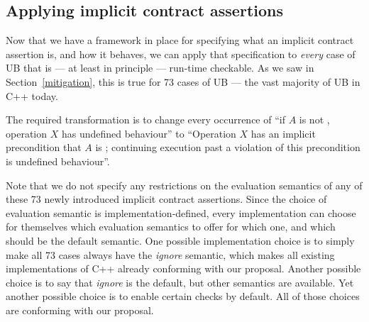 \subsection{Applying implicit contract assertions}
\label{applyicas}

Now that we have a framework in place for specifying what an implicit contract assertion is, and how it behaves, we can apply that specification to \emph{every} case of UB  that is --- at least in principle --- run-time checkable. As we saw in Section~\ref{mitigation}, this is true for 73 cases of UB --- the vast majority of UB in C++ today.

The required transformation is to change every occurrence of “if $A$ is not , operation $X$ has undefined behaviour'' to ``Operation $X$ has an implicit precondition that $A$ is ; continuing execution past a violation of this precondition is undefined behaviour''.

Note that we do not specify any restrictions on the evaluation semantics of any of these 73 newly introduced  implicit contract assertions. Since the choice of evaluation semantic is implementation-defined, every implementation can choose for themselves which evaluation semantics to offer for which one, and which should be the default semantic. One possible implementation choice is to simply make all 73 cases always have the \emph{ignore} semantic, which makes all existing implementations of C++ already conforming with our proposal. Another possible choice is to say that  \emph{ignore} is the default, but other semantics are available. Yet another possible choice is to enable certain checks by default. All of those choices are conforming with our proposal.

